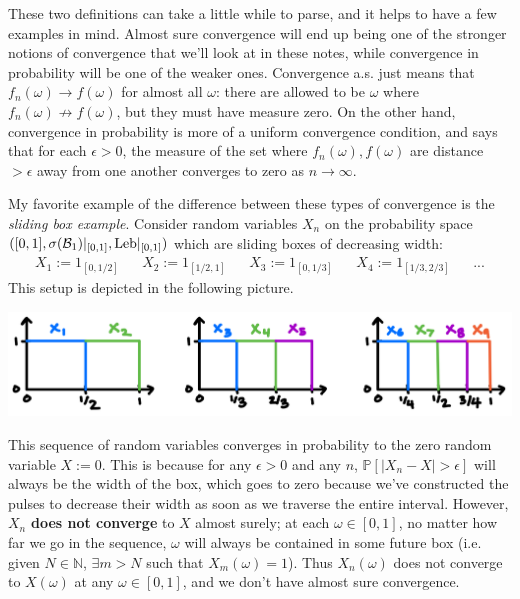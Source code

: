 These two definitions can take a little while to parse, and it helps to have a few examples in mind. Almost sure convergence will end up being one of the stronger notions of convergence that we'll look at in these notes, while convergence in probability will be one of the weaker ones. Convergence a.s. just means that $f_n(\omega)\rightarrow f(\omega)$ for almost all $\omega$: there are allowed to be $\omega$ where $f_n(\omega)\not\rightarrow f(\omega)$, but they must have measure zero. On the other hand, convergence in probability is more of a uniform convergence condition, and says that for each $\epsilon > 0$, the measure of the set where $f_n(\omega), f(\omega)$ are distance $> \epsilon$ away from one another converges to zero as $n\rightarrow\infty$. 

\begin{example}
	My favorite example of the difference between these types of convergence is the \textit{sliding box example}. Consider random variables $X_n$ on the probability space $([0, 1], \sigma(\mathcal B_1)|_{[0, 1]}, \mathrm{Leb} |_{[0, 1]})$ which are sliding boxes of decreasing width:
	\begin{align}
		X_1 := 1_{[0, 1/2]} && X_2 := 1_{[1/2, 1]} && X_3 := 1_{[0, 1/3 ]} && X_4 := 1_{[1/3, 2/3]} && ...
	\end{align}
	This setup is depicted in the following picture.
	
	{
	\centering
	\includegraphics[width = \textwidth]{sliding_box_ex}
	}
	
	This sequence of random variables converges in probability to the zero random variable $X := 0$. This is because for any $\epsilon > 0$ and any $n$, $\mathbb P[|X_n - X| > \epsilon]$ will always be the width of the box, which goes to zero because we've constructed the pulses to decrease their width as soon as we traverse the entire interval. However, $X_n$ \textbf{does not converge} to $X$ almost surely; at each $\omega\in [0, 1]$, no matter how far we go in the sequence, $\omega$ will always be contained in some future box (i.e. given $N\in\mathbb N$, $\exists m > N$ such that $X_m(\omega) = 1$). Thus $X_n(\omega)$ does not converge to $X(\omega)$ at any $\omega\in [0, 1]$, and we don't have almost sure convergence. 
\end{example}

